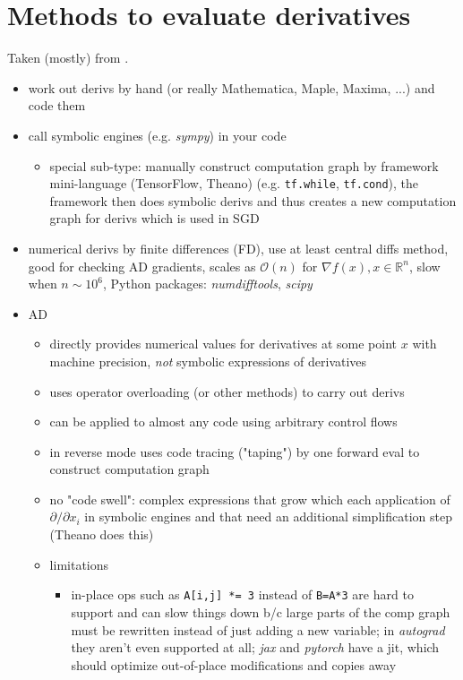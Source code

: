 \documentclass[parskip,paper=a4,11pt,headsepline]{scrartcl}
\newcommand{\ve}[1]{\ensuremath{\bm{\mathit{#1}}}}
\newcommand{\soft}[1]{\textsl{#1}\xspace}
\newcommand{\pytorch}{\soft{pytorch}}
\newcommand{\jax}{\soft{jax}}
\newcommand{\autograd}{\soft{autograd}}
\newcommand{\scipy}{\soft{scipy}}
\newcommand{\numdifftools}{\soft{numdifftools}}
\newcommand{\co}[1]{\texttt{#1}}
\begin{document}
\section{Methods to evaluate derivatives}
%
Taken (mostly) from \cite{baydin_2018}.

\begin{itemize}
    \item work out derivs by hand (or really Mathematica, Maple, Maxima, ...)
        and code them
    \item call symbolic engines (e.g. \soft{sympy}) in your code
    \begin{itemize}
        \item special sub-type: manually construct computation graph by
            framework mini-language (TensorFlow, Theano) (e.g. \co{tf.while},
            \co{tf.cond}), the framework then does symbolic derivs and thus
            creates a new computation graph for derivs which is used in SGD
    \end{itemize}
\item numerical derivs by finite differences (FD), use at least central diffs method,
    good for checking AD gradients, scales as $\mathcal
    O(n)$ for $\nabla f(\ve x), \ve x\in\mathbb R^n$, slow when $n\sim 10^6$,
    Python packages: \numdifftools, \scipy
\item AD
    \begin{itemize}
        \item directly provides numerical values for derivatives at some point
            $\ve x$ with machine precision, \emph{not} symbolic expressions of
            derivatives
        \item uses operator overloading (or other methods) to carry out derivs
        \item can be applied to almost any code using arbitrary control flows
        \item in reverse mode uses code tracing ("taping") by one forward eval
            to construct computation graph
        \item no "code swell": complex expressions that grow which each
            application of $\partial/\partial x_i$ in symbolic engines and that
            need an additional simplification step (Theano does this)
        \item limitations
        \begin{itemize}
            \item in-place ops such as \co{A[i,j] *= 3} instead of
                \co{B=A*3} are hard to support and can slow things down b/c
                large parts of the comp graph must be rewritten instead of just
                adding a new variable; in \autograd they aren't even
                supported at all; \jax and \pytorch have a jit,
                which should optimize out-of-place modifications and copies
                away
        \end{itemize}
    \end{itemize}
\end{itemize}
%
\end{document}
